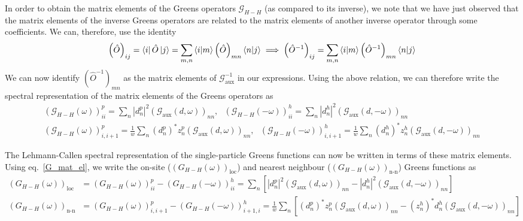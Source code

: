 \documentclass{report}
\numberwithin{equation}{section}
\begin{document}
In order to obtain the matrix elements of the Greens operators \(\mathcal{G}_{H-H}\) (as compared to its inverse), we note that we have just observed that the matrix elements of the inverse Greens operators are related to the matrix elements of another inverse operator through some coefficients. We can, therefore, use the identity
\begin{equation}\begin{aligned}
\left(\hat O\right)_{ij} = \bra{i} \hat O \ket{j} = \sum_{m,n} \braket{i|m} \left(\hat O\right)_{mn} \braket{n|j} \implies \left(\hat O^{-1}\right)_{ij} = \sum_{m,n} \braket{i|m} \left(\hat O^{-1}\right)_{mn} \braket{n|j}
\end{aligned}\end{equation}
We can now identify \(\left(\hat O^{-1}\right)_{mn}\) as the matrix elements of \(\mathcal{G}_\text{aux}^{-1}\) in our expressions. Using the above relation, we can therefore write the spectral representation of the matrix elements of the Greens operators as 
\begin{gather}
	\left(\mathcal{G}_{H-H}(\omega)\right)^p_{ii} = \sum_{n} |d^p_n|^2 \left(\mathcal{G}_\text{aux}(d, \omega)\right)_{nn}, ~ ~ ~ \left(\mathcal{G}_{H-H}(-\omega)\right)^h_{ii} = \sum_{n} |d^h_n|^2 \left(\mathcal{G}_\text{aux}(d, -\omega)\right)_{nn}\\
	\left(\mathcal{G}_{H-H}\left(\omega\right) \right)^p_{i,i+1} = \frac{1}{w} \sum_n \left(d^p_n\right)^* z^p_n \left(\mathcal{G}_\text{aux}(d, \omega) \right)_{nn}, ~ ~ ~ \left(\mathcal{G}_{H-H}\left(-\omega\right) \right)^h_{i,i+1} = \frac{1}{w} \sum_n \left(d^h_n\right)^* z^h_n \left(\mathcal{G}_\text{aux}(d, -\omega) \right)_{nn}
\end{gather}

The Lehmann-Callen spectral representation of the single-particle Greens functions can now be written in terms of these matrix elements. Using eq.~\ref{G_mat_el}, we write the on-site ($\left(G_{H-H}(\omega)\right)_\text{loc}$) and nearest neighbour ($\left(G_{H-H}(\omega)\right)_\text{n-n}$) Greens functions as
\begin{equation}\begin{aligned}
	\label{greens_func_siam}
	\left(G_{H-H}(\omega)\right)_\text{loc} &= \left(G_{H-H}(\omega)\right)_{ii}^p - \left(G_{H-H}(-\omega)\right)_{ii}^h = \sum_n \left[|d^p_n|^2 \left(\mathcal{G}_\text{aux}(d, \omega)\right)_{nn} - |d^h_n|^2 \left(\mathcal{G}_\text{aux}(d, -\omega)\right)_{nn}\right] \\
	\left(G_{H-H}(\omega)\right)_\text{n-n} &= \left(G_{H-H}(\omega)\right)_{i,i+1}^p - \left(G_{H-H}(-\omega)\right)_{i+1,i}^h = \frac{1}{w}\sum_n \left[\left(d^p_n\right)^* z^p_n \left(\mathcal{G}_\text{aux}(d, \omega) \right)_{nn} - \left(z^h_n\right)^* d^h_n \left(\mathcal{G}_\text{aux}(d, -\omega)\right)_{nn}\right] 
\end{aligned}\end{equation}
\end{document}
